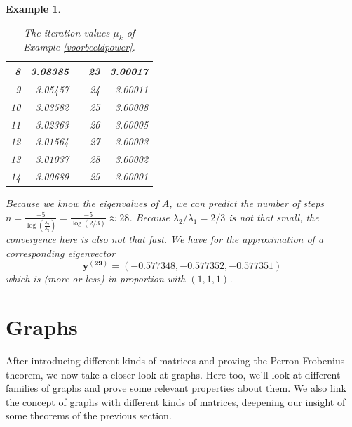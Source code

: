 \documentclass[a4paper,11pt]{report}
\newtheorem{example}[theorem]{Example}
\begin{document}
\begin{example}
\begin{table}[h!]
\begin{tabular}{|r|r|r|r|r|}
8                         & 3.08385                      &                       & 23                       & 3.00017                      \\ \hline
9                         & 3.05457                      &                       & 24                       & 3.00011                      \\ \hline
10                        & 3.03582                      &                       & 25                       & 3.00008                      \\ \hline
11                        & 3.02363                      &                       & 26                       & 3.00005                      \\ \hline
12                        & 3.01564                      &                       & 27                       & 3.00003                      \\ \hline
13                        & 3.01037                      &                       & 28                       & 3.00002                      \\ \hline
14                        & 3.00689                      &                       & 29                       & 3.00001                      \\ \hline
\end{tabular}
\caption{The iteration values $\mu_k$ of  Example \ref{voorbeeldpower}.} 
\end{table}\label{tablepower}
Because we know the eigenvalues of $A$, we can predict the number of steps 
$n = \frac{-5}{\log(\frac{\lambda_2}{\lambda_2})} = \frac{-5}{\log(2/3)} \approx 28$. Because $\lambda_2/\lambda_1 = 2/3$ 
is not that small, the convergence here is also not that fast.  We have for the 
approximation of a corresponding eigenvector $$\mathbf{y^{(29)}} = (-0.577348, -0.577352, -0.577351)$$ 
which is (more or less) in proportion with $(1,1,1)$.

\end{example}


\newpage
\section{Graphs}
After introducing different kinds of matrices and proving the Perron-Frobenius 
theorem, we now take a closer look at graphs. Here too, we'll look at different 
families of graphs and prove some relevant properties about them. We also link 
the concept of graphs with different kinds of matrices, deepening our 
insight of some theorems of the previous section.\\
\end{document}
